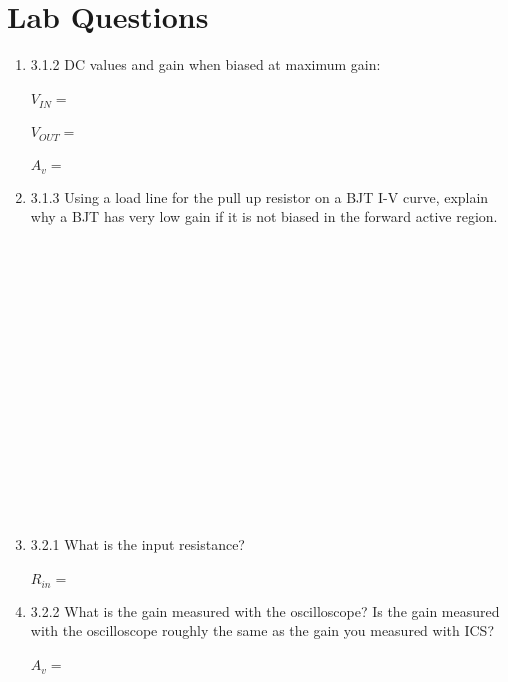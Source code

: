 \documentclass{article}
\begin{document}
\thispagestyle{plain}

\name

\section{Lab Questions}

\begin {enumerate}
	
	\item[3.1.2] DC values and gain when biased at maximum gain:\\~\\
    	$\boxed{V_{IN}   = ~~~~~~~~~~~~~~~~~~~~~~~}$ \\ ~ \\
    	$\boxed{V_{OUT}  = ~~~~~~~~~~~~~~~~~~~~~}$ \\ ~ \\
    	$\boxed{A_{v}    = ~~~~~~~~~~~~~~~~~~~~~~~}$

	\item[3.1.3] Using a load line for the pull up resistor on a BJT I-V curve, explain why a BJT has very low gain if it is not biased in the forward active region.
	\\~\\~\\~\\~\\~\\~\\~\\~\\~\\~\\~\\~\\~\\~\\~\\

	\item[3.2.1] What is the input resistance? \\~\\
	  $\boxed{R_{in}   = ~~~~~~~~~~~~~~~~~~~~~~~~~~~~~~~~~~~~~~}$
	  
	\item[3.2.2] What is the gain measured with the oscilloscope? Is the gain measured with the oscilloscope roughly the same as the gain you measured with ICS? \\~\\
	  $\boxed{A_v = ~~~~~~~~~~~~~~~~~~~~~~~~~~~~~~~~~~~~~~}$


\end{enumerate}
\end{document}
